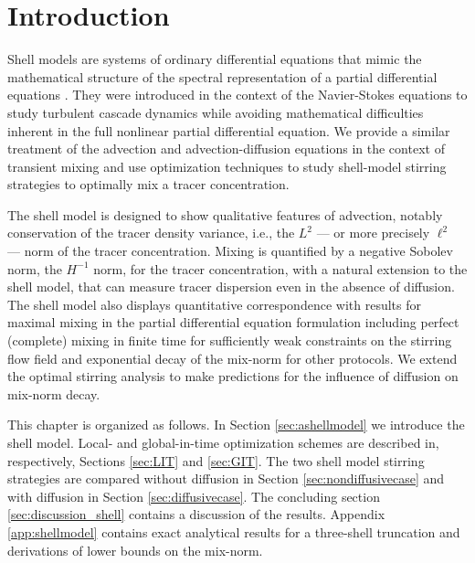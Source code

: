 


\section{Introduction}


Shell models are systems of ordinary differential equations that mimic the mathematical structure of the spectral representation of a partial differential equations \cite{PD2010}. They were introduced in the context of the Navier-Stokes equations to study turbulent cascade dynamics \cite{MHJ,Gledzer1973,Yamada1988a} while avoiding mathematical difficulties inherent in the full nonlinear partial differential equation. We provide a similar treatment of the advection and advection-diffusion equations in the context of transient mixing and use optimization techniques to study shell-model stirring strategies to optimally mix a tracer concentration.

The shell model is designed to show qualitative features of advection, notably conservation of the tracer density variance, i.e., the $L^2$ --- or more precisely $\ell^2$ --- norm of the tracer concentration. Mixing is quantified by a negative Sobolev norm, the $H^{-1}$ norm, for the tracer concentration, with a natural extension to the shell model, that can measure tracer dispersion even in the absence of diffusion. The shell model also displays quantitative correspondence with results for maximal mixing in the partial differential equation formulation including perfect (complete) mixing in finite time for sufficiently weak constraints on the stirring flow field and exponential decay of the mix-norm for other protocols. We extend the optimal stirring analysis to make predictions for the influence of diffusion on mix-norm decay.

This chapter is organized as follows. In Section \ref{sec:ashellmodel} we introduce the shell model. Local- and global-in-time optimization schemes are described in, respectively, Sections \ref{sec:LIT} and \ref{sec:GIT}. The two shell model stirring strategies are compared without diffusion in Section \ref{sec:nondiffusivecase}  and with diffusion in Section \ref{sec:diffusivecase}. The concluding section \ref{sec:discussion_shell} contains a discussion of the results. Appendix \ref{app:shellmodel} contains exact analytical results for a three-shell truncation and derivations of lower bounds on the mix-norm.

